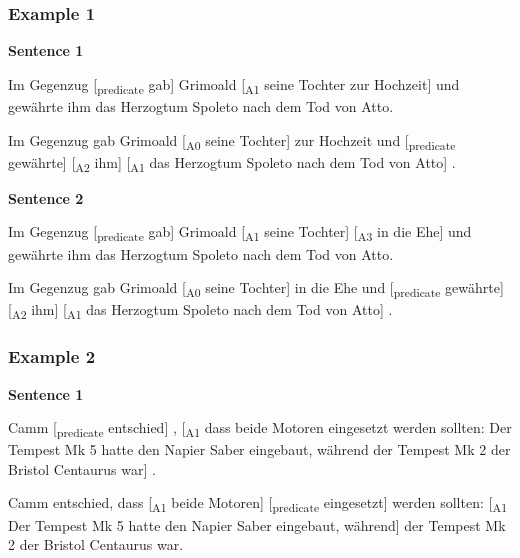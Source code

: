 \begin{landscape}

\subsubsection{Example 1}

\textbf{Sentence 1}

Im Gegenzug [\textsubscript{predicate} gab] Grimoald [\textsubscript{A1} seine Tochter zur Hochzeit] und gewährte ihm das Herzogtum Spoleto nach dem Tod von Atto.

Im Gegenzug gab Grimoald [\textsubscript{A0} seine Tochter] zur Hochzeit und [\textsubscript{predicate} gewährte] [\textsubscript{A2} ihm] [\textsubscript{A1} das Herzogtum Spoleto nach dem Tod von Atto] .

\textbf{Sentence 2}

Im Gegenzug [\textsubscript{predicate} gab] Grimoald [\textsubscript{A1} seine Tochter] [\textsubscript{A3} in die Ehe] und gewährte ihm das Herzogtum Spoleto nach dem Tod von Atto.

Im Gegenzug gab Grimoald [\textsubscript{A0} seine Tochter] in die Ehe und [\textsubscript{predicate} gewährte] [\textsubscript{A2} ihm] [\textsubscript{A1} das Herzogtum Spoleto nach dem Tod von Atto] .



\subsubsection{Example 2}

\textbf{Sentence 1}

Camm [\textsubscript{predicate} entschied] , [\textsubscript{A1} dass beide Motoren eingesetzt werden sollten: Der Tempest Mk 5 hatte den Napier Saber eingebaut, während der Tempest Mk 2 der Bristol Centaurus war] .

Camm entschied, dass [\textsubscript{A1} beide Motoren] [\textsubscript{predicate} eingesetzt] werden sollten: [\textsubscript{A1} Der Tempest Mk 5 hatte den Napier Saber eingebaut, während] der Tempest Mk 2 der Bristol Centaurus war.


\end{landscape}
